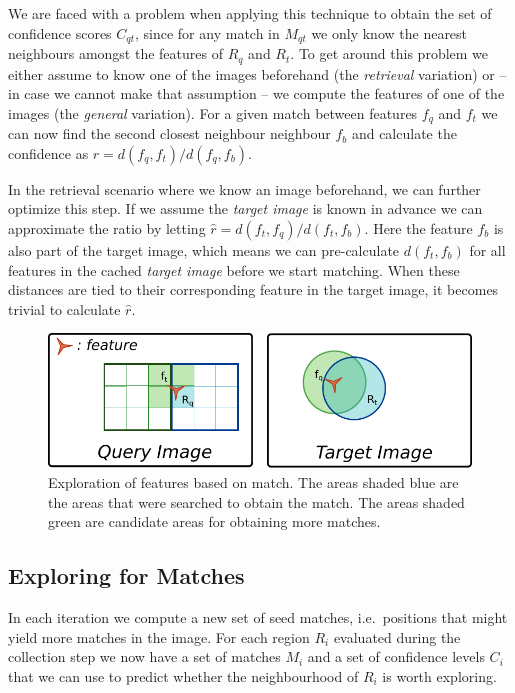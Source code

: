 \documentclass[runningheads]{llncs}
\begin{document}
We are faced with a problem when applying this technique to obtain the set of confidence scores $C_{qt}$, since for any match in $M_{qt}$ we only know the nearest neighbours amongst the features of $R_q$ and $R_t$. To get around this problem we either assume to know one of the images beforehand (the \emph{retrieval} variation) or -- in case we cannot make that assumption -- we compute the features of one of the images (the \emph{general} variation). For a given match between features $f_q$ and $f_t$ we can now find the second closest neighbour neighbour $f_b$ and calculate the confidence as $r = d(f_q, f_t)/d(f_q,f_b)$.

In the retrieval scenario where we know an image beforehand, we can further optimize this step. If we assume the \emph{target image} is known in advance we can approximate the ratio by letting $\hat r = d(f_t, f_q)/d(f_t,f_b)$. Here the feature $f_b$ is also part of the target image, which means we can pre-calculate $d(f_t, f_b)$ for all features in the cached \emph{target image} before we start matching. When these distances are tied to their corresponding feature in the target image, it becomes trivial to calculate $\hat r$.

\begin{figure}[t]
\centering
\includegraphics[width=0.75\columnwidth]{images/exploration}
\caption{Exploration of features based on match. The areas shaded blue are the areas that were searched to obtain the match. The areas shaded green are candidate areas for obtaining more matches.}
\label{fig:exploration}
\end{figure}

\subsection{Exploring for Matches}
\label{exploring}
%
In each iteration we compute a new set of seed matches, i.e.\ positions that might yield more matches in the image. For each region $R_i$ evaluated during the collection step we now have a set of matches $M_i$ and a set of confidence levels $C_i$ that we can use to predict whether the neighbourhood of $R_i$ is worth exploring.
\end{document}
